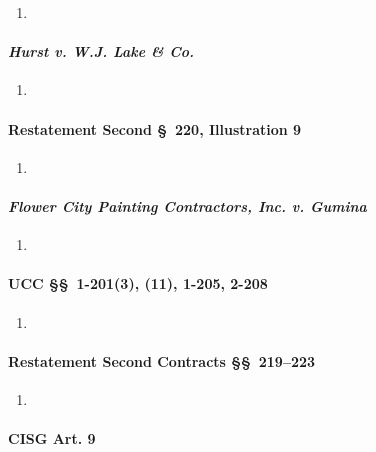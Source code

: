 \begin{enumerate}
    \item %
\end{enumerate}

\paragraph{\emph{Hurst v. W.J. Lake \& Co.}}

\begin{enumerate}
    \item %
\end{enumerate}

\paragraph{Restatement Second \S\ 220, Illustration 9}

\begin{enumerate}
    \item %
\end{enumerate}

\paragraph{\emph{Flower City Painting Contractors, Inc. v. Gumina}}

\begin{enumerate}
    \item %
\end{enumerate}

\paragraph{UCC \S\S\ 1-201(3), (11), 1-205, 2-208}

\begin{enumerate}
    \item %
\end{enumerate}

\paragraph{Restatement Second Contracts \S\S\ 219--223}

\begin{enumerate}
    \item %
\end{enumerate}

\paragraph{CISG Art. 9}

